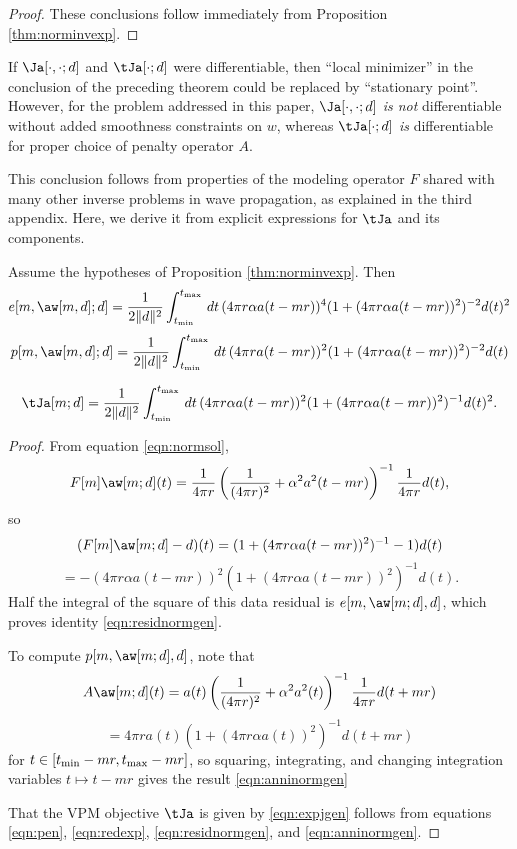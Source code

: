 \begin{proof} These conclusions follow immediately from Proposition
  \ref{thm:norminvexp}.
\end{proof}

 If $\Ja[\cdot,\cdot;d]$ and $\tJa[\cdot;d]$
were differentiable, then ``local minimizer'' in the conclusion of the
preceding theorem could be replaced by ``stationary point''. However,
for the problem addressed in this paper, $\Ja[\cdot,\cdot;d]$ {\em is
  not} differentiable without added smoothness constraints on $w$,
whereas $\tJa[\cdot;d]$ {\em is} differentiable for proper choice of
penalty operator $A$. 

This conclusion follows from properties of the modeling operator $F$
shared with many other inverse problems in wave propagation, as
explained in the third appendix. Here, we derive it from explicit
expressions for $\tJa$ and its components.

\begin{proposition}
  \label{thm:epjgen}
  Assume the hypotheses of Proposition \ref{thm:norminvexp}. Then
  \begin{equation}
  \label{eqn:residnormgen}
  e[m,\aw[m,d];d] = \frac{1}{2\|d\|^2}\int_{t_{\rm min}}^{t_{\rm max}} \,dt\,(4\pi r \alpha a(t-mr))^4(1 +
  (4\pi r \alpha a(t-mr))^2)^{-2}d(t)^2
\end{equation}
\begin{equation}
  \label{eqn:anninormgen}
  p[m,\aw[m,d];d] = \frac{1}{2\|d\|^2}\int_{t_{\rm min}}^{t_{\rm max}} \,dt\,(4\pi r a(t-mr))^2(1 +
  (4\pi r \alpha a(t-mr))^2)^{-2}d(t)
\end{equation}

\begin{equation}
  \label{eqn:expjgen}
\tJa[m;d] = \frac{1}{2\|d\|^2}\int_{t_{\rm min}}^{t_{\rm max}}\,dt\,(4\pi r \alpha a(t-mr))^2(1+(4\pi r \alpha 
a(t-mr))^2)^{-1}d(t)^2. 
\end{equation}
\end{proposition}

\begin{proof}
  From equation \ref{eqn:normsol},
  \[
    F[m]\aw[m;d](t) = 
    \frac{1}{4 \pi r}\left(\frac{1}{(4\pi r)^2} + \alpha^2
      a^2(t-mr)\right)^{-1}\frac{1}{4 \pi r}d(t),
  \]
  so
  \[
    (F[m]\aw[m;d]-d)(t) = (1 + (4 \pi r\alpha
    a(t-mr))^2)^{-1}-1)d(t)
  \]
  \[
    = -(4 \pi r\alpha a(t-mr))^2(1 + (4 \pi r\alpha
    a(t-mr))^2)^{-1}d(t).
  \]
  Half the integral of the square of this data residual is
  $e[m,\aw[m;d],d]$, which proves identity \ref{eqn:residnormgen}.

  To compute $p[m,\aw[m;d],d]$, note that
  \[
    A\aw[m;d](t)=a(t) \left(\frac{1}{(4\pi r)^2} + \alpha^2
      a^2(t)\right)^{-1}\frac{1}{4 \pi r}d(t+mr)
  \]
  \[
    = 4\pi r a(t) (1 + (4\pi r \alpha a(t))^2)^{-1}d(t+mr)
  \]
  for $ t \in [t_{\rm min}-mr, t_{\rm max}-mr]$, so squaring,
  integrating, and changing integration variables $t \mapsto t-mr$
  gives the result \ref{eqn:anninormgen}

  That the VPM objective $\tJa$ is given by \ref{eqn:expjgen} follows from equations \ref{eqn:pen},
  \ref{eqn:redexp}, \ref{eqn:residnormgen}, and
  \ref{eqn:anninormgen}.
\end{proof}


